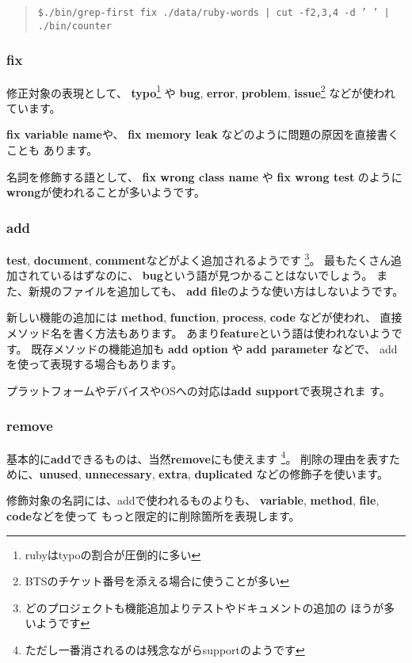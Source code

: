 \documentclass{jarticle}
\begin{document}
   \begin{quote}
    {\tt \$./bin/grep-first fix ./data/ruby-words | cut -f2,3,4 -d ' ' | ./bin/counter }
   \end{quote}

   \subsubsection{fix}
   修正対象の表現として、
   {\bf typo}\footnote{rubyはtypoの割合が圧倒的に多い} や
   {\bf bug}, {\bf error}, {\bf problem},
   {\bf issue}\footnote{BTSのチケット番号を添える場合に使うことが多い}
   などが使われています。

   {\bf fix variable name}や、
   {\bf fix memory leak} などのように問題の原因を直接書くことも
   あります。

   名詞を修飾する語として、
   {\bf fix wrong class name} や {\bf fix wrong test} のように
   {\bf wrong}が使われることが多いようです。

   \subsubsection{add}
   {\bf test}, {\bf document}, {\bf comment}などがよく追加されるようです
   \footnote{どのプロジェクトも機能追加よりテストやドキュメントの追加の
   ほうが多いようです}。
   最もたくさん追加されているはずなのに、
   {\bf bug}という語が見つかることはないでしょう。
   また、新規のファイルを追加しても、
   {\bf add file}のような使い方はしないようです。

   新しい機能の追加には
   {\bf method}, {\bf function}, {\bf process}, {\bf code}
   などが使われ、
   直接メソッド名を書く方法もあります。
   あまり{\bf feature}という語は使われないようです。
   既存メソッドの機能追加も {\bf add option} や {\bf add parameter} などで、
   addを使って表現する場合もあります。

   プラットフォームやデバイスやOSへの対応は{\bf add support}で表現されま
   す。

   \subsubsection{remove}
   基本的に{\bf add}できるものは、当然{\bf remove}にも使えます
   \footnote{ただし一番消されるのは残念ながらsupportのようです}。
   削除の理由を表すために、{\bf unused}, {\bf unnecessary},
   {\bf extra}, {\bf duplicated} などの修飾子を使います。

   修飾対象の名詞には、addで使われるものよりも、
   {\bf variable}, {\bf method}, {\bf file}, {\bf code}などを使って
   もっと限定的に削除箇所を表現します。
\end{document}
